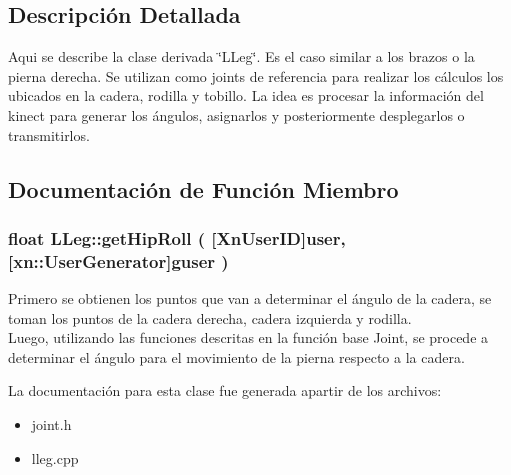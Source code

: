 \subsection{\-Descripción \-Detallada}
\-Aqui se describe la clase derivada \char`\"{}\-LLeg\char`\"{}. Es el caso similar a los brazos o la pierna derecha. Se utilizan como joints de referencia para realizar los cálculos los ubicados en la cadera, rodilla y tobillo. La idea es procesar la información del kinect para generar los ángulos, asignarlos y posteriormente desplegarlos o transmitirlos.

\subsection{\-Documentación de \-Función \-Miembro}
\hypertarget{class_l_leg_ac0d2147e72701ad8202b758bb572735f}{
\subsubsection[{get\-Hip\-Roll}]{\setlength{\rightskip}{0pt plus 5cm}float {\bf \-L\-Leg\-::get\-Hip\-Roll} (
[{\-Xn\-User\-I\-D}]{user, }
[{xn\-::\-User\-Generator}]{guser}
)}}\label{class_l_leg_ac0d2147e72701ad8202b758bb572735f}


\-Primero se obtienen los puntos que van a determinar el ángulo de la cadera, se toman los puntos de la cadera derecha, cadera izquierda y rodilla.\\
\-Luego, utilizando las funciones descritas en la función base Joint, se procede a determinar el ángulo para el movimiento de la pierna respecto a la cadera. 

\-La documentación para esta clase fue generada apartir de los archivos\-:\begin{itemize}
\item 
joint.\-h\item 
lleg.\-cpp\end{itemize}
